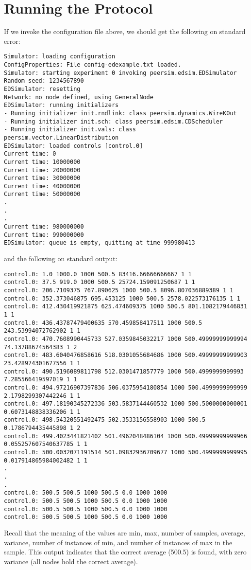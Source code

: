 \documentclass[a4paper,11pt]{article}
\begin{document}
\section{Running the Protocol}

If we invoke the configuration file above, we should get the following on
standard error:
\footnotesize
\begin{verbatim}
Simulator: loading configuration
ConfigProperties: File config-edexample.txt loaded.
Simulator: starting experiment 0 invoking peersim.edsim.EDSimulator
Random seed: 1234567890
EDSimulator: resetting
Network: no node defined, using GeneralNode
EDSimulator: running initializers
- Running initializer init.rndlink: class peersim.dynamics.WireKOut
- Running initializer init.sch: class peersim.edsim.CDScheduler
- Running initializer init.vals: class peersim.vector.LinearDistribution
EDSimulator: loaded controls [control.0]
Current time: 0
Current time: 10000000
Current time: 20000000
Current time: 30000000
Current time: 40000000
Current time: 50000000
.
.
.
Current time: 980000000
Current time: 990000000
EDSimulator: queue is empty, quitting at time 999980413
\end{verbatim}
\normalsize

and the following on standard output:

\scriptsize
\begin{verbatim}
control.0: 1.0 1000.0 1000 500.5 83416.66666666667 1 1
control.0: 37.5 919.0 1000 500.5 25724.159091250687 1 1
control.0: 206.7109375 767.890625 1000 500.5 8096.807036889389 1 1
control.0: 352.373046875 695.453125 1000 500.5 2578.022573176135 1 1
control.0: 412.430419921875 625.474609375 1000 500.5 801.1082179446831 1 1
control.0: 436.43787479400635 570.459858417511 1000 500.5 243.53994072762902 1 1
control.0: 470.7608990445733 527.0359845032217 1000 500.49999999999994 74.13788674564383 1 2
control.0: 483.6040476858616 518.0301055684686 1000 500.49999999999903 23.428974301677556 1 1
control.0: 490.5196089811798 512.0301471857779 1000 500.4999999999993 7.285566419597019 1 1
control.0: 494.97216907397836 506.0375954180854 1000 500.4999999999999 2.1798299307442246 1 1
control.0: 497.18190345272336 503.5837144460532 1000 500.5000000000001 0.6073148838336206 1 1
control.0: 498.54320551492475 502.3533156558903 1000 500.5 0.1786794435445898 1 2
control.0: 499.4023441821402 501.4962048486104 1000 500.49999999999966 0.055257607540637785 1 1
control.0: 500.0032071191514 501.09832936709677 1000 500.4999999999995 0.017914865984002482 1 1
.
.
.
control.0: 500.5 500.5 1000 500.5 0.0 1000 1000
control.0: 500.5 500.5 1000 500.5 0.0 1000 1000
control.0: 500.5 500.5 1000 500.5 0.0 1000 1000
control.0: 500.5 500.5 1000 500.5 0.0 1000 1000
\end{verbatim}
\normalsize
Recall that the meaning of the values are min, max, number of samples,
average, variance, number of instances of min, and number of instances of max
in the sample.
This output indicates that the correct average (500.5) is found, with
zero variance (all nodes hold the correct average).
\end{document}
